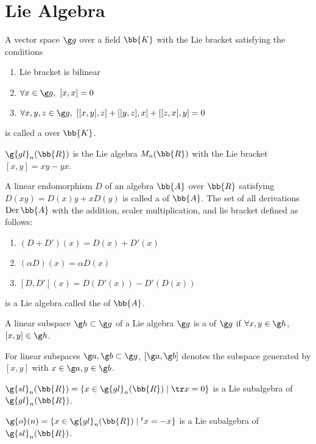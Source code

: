 \newcommand{\gl}{\g{gl}}
\renewcommand{\sl}{\g{sl}}
\renewcommand{\o}{\g{o}}
\section{Lie Algebra}\cite{samu}
A vector space $\g g$ over a field $\bb{K}$ with the Lie bracket satisfying the conditions
\begin{enumerate}
\item Lie bracket is bilinear
\item $\forall x \in \g g,\ [x,x] = 0$
\item $\forall x, y, z \in \g g,\ [[x,y],z]+[[y,z],x]+[[z,x],y] = 0$
\end{enumerate}
is called a  over $\bb{K}$.

$\g{gl}_n(\bb{R})$ is the Lie algebra $M_n(\bb{R})$ with the Lie bracket $[x,y] = xy - yx$.

A linear endomorphism $D$ of an algebra $\bb{A}$ over $\bb{R}$ satisfying $D(xy) = D(x)y + xD(y)$ is called a  of $\bb{A}$. The set of all derivations $\mathrm{Der}\, \bb{A}$ with the addition, scaler multiplication, and lie bracket defined as follows:
\begin{enumerate}
\item $(D+D')(x) = D(x)+D'(x)$
\item $(\alpha D)(x) = \alpha D(x)$
\item $[D,D'](x) = D(D'(x)) - D'(D(x))$
\end{enumerate}
is a Lie algebra called the  of $\bb{A}$.

A linear subspace $\g h \subset \g g$ of a Lie algebra $\g g$ is a  of $\g g$ if $\forall x, y \in \g h$, $[x,y] \in \g h$.

For linear subspaces $\g a, \g b \subset \g g$, $[\g a, \g b]$ denotes the subspace generated by $[x,y]$ with $x \in \g a, y \in \g b$.

$\sl_n(\bb{R}) = \{ x \in \gl_n(\bb{R}) \mid \tr x = 0 \} $ is a Lie subalgebra of $\gl_n(\bb{R})$.

$\o(n) = \{ x \in \gl_n(\bb{R}) \mid {}^tx = -x \}$ is a Lie subalgebra of $\sl_n(\bb{R})$.

